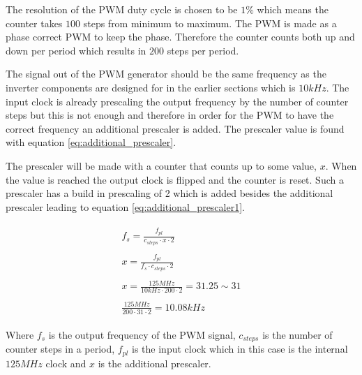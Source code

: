 The resolution of the PWM duty cycle is chosen to be $1\%$ which means the counter takes $100$ steps from minimum to maximum. The PWM is made as a phase correct PWM to keep the phase. Therefore the counter counts both up and down per period which results in $200$ steps per period. 

The signal out of the PWM generator should be the same frequency as the inverter components are designed for in the earlier sections which is $10kHz$. The input clock is already prescaling the output frequency by the number of counter steps but this is not enough and therefore in order for the PWM to have the correct frequency an additional prescaler is added. The prescaler value is found with equation \ref{eq:additional_prescaler}.

The prescaler will be made with a counter that counts up to some value, $x$. When the value is reached the output clock is flipped and the counter is reset. Such a prescaler has a build in prescaling of 2 which is added besides the additional prescaler leading to equation \ref{eq:additional_prescaler1}.



\begin{subequations}
    \begin{align}
        \begin{split}
            f_{s} = \frac{f_{pl}}{c_{steps} \cdot x \cdot 2}
            \label{eq:additional_prescaler1}
        \end{split} \\ 
        \begin{split}
             x = \frac{f_{pl}}{f_{s} \cdot c_{steps} \cdot 2}
        \end{split} \\ 
        \begin{split}
            x = \frac{125MHz}{10kHz \cdot 200 \cdot 2} = 31.25 \sim 31
            \label{eq:additional_prescaler}
        \end{split} \\
        \begin{split}
            \frac{125MHz}{200 \cdot 31 \cdot 2} = 10.08kHz
        \end{split}
    \end{align}
\end{subequations}

Where $f_{s}$ is the output frequency of the PWM signal, $c_{steps}$ is the number of counter steps in a period, $f_{pl}$ is the input clock which in this case is the internal $125MHz$ clock and $x$ is the additional prescaler.

